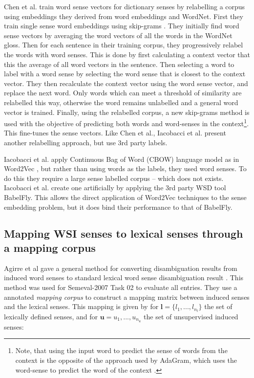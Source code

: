 \documentclass{sig-alternate}
\renewcommand{\l}{\mathbf{l}}
\renewcommand{\u}{\mathbf{u}}
\begin{document}
Chen et al. \parencite{Chen2014} train word sense vectors for dictionary senses by relabelling a corpus using embeddings they derived from word embeddings and WordNet. First they train single sense word embeddings using skip-grams \parencite{mikolov2013efficient}. They initially find word sense vectors by averaging the word vectors of all the words in the WordNet gloss.
Then for each sentence in their training corpus, they progressively relabel the words with word senses. This is done by first calculating a context vector that this the average of all word vectors in the sentence. Then selecting a word to label with a word sense by selecting the word sense that is closest to the context vector. They then recalculate the context vector using the word sense vector, and replace the next word. Only words which can meet a threshold of similarity are relabelled this way, otherwise the word remains unlabelled and a general word vector is trained.  Finally, using the relabelled corpus, a new skip-grams method is used with the objective of predicting both words and word-senses in the context\footnote{Note, that using the input word to predict the sense of words from the context is the opposite of the approach used by AdaGram, which uses the word-sense to predict the word of the context \parencite{AdaGrams}.}. This fine-tunes the sense vectors.  Like Chen et al., Iacobacci et al. \parencite{iacobacci2015sensembed} present another relabelling approach, but use 3rd party labels.


Iacobacci et al. \parencite{iacobacci2015sensembed} apply Continuous Bag of Word (CBOW) language model as in Word2Vec , but rather than using words as the labels, they used word senses. To do this they require a large sense labelled corpus -- which does not exists. Iacobacci et al. create one artificially by applying the 3rd party WSD tool BabelFly. This allows the direct application of Word2Vec techniques to the sense embedding problem, but it does bind their performance to that of BabelFly. 


\subsection{Mapping WSI senses to lexical senses through a mapping corpus}


Agirre et al gave a general method for converting disambiguation results from induced word senses to standard lexical word sense disambiguation result \parencite{agirre2006}. This method was used for Semeval-2007 Task 02 \parencite{SemEval2007WSIandWSD} to evaluate all entries.
They use a annotated \emph{mapping corpus} to construct a mapping matrix between induced senses and the lexical senses.
This mapping is given by for $\l=\{l_1,..., l_{n_l}\}$ the set of lexically defined senses, and for $\u={u_1,...,u_{n_u}}$ the set of unsupervised induced senses:
\end{document}
